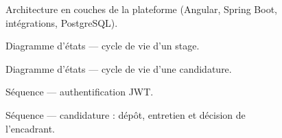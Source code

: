 

\begin{figure}[H]
\centering
{}
\caption{Architecture en couches de la plateforme (Angular, Spring Boot, intégrations, PostgreSQL).}
\label{fig:architecture}
\end{figure}

\begin{figure}[H]
\centering
{}
\caption{Diagramme d'états — cycle de vie d'un stage.}
\label{fig:etat-stage}
\end{figure}

\begin{figure}[H]
\centering
{}
\caption{Diagramme d'états — cycle de vie d'une candidature.}
\label{fig:etat-candidature}
\end{figure}


\begin{figure}[H]
\centering
{}
\caption{Séquence — authentification JWT.}
\label{fig:seq-login}
\end{figure}

\begin{figure}[H]
\centering
{}
\caption{Séquence — candidature : dépôt, entretien et décision de l'encadrant.}
\label{fig:seq-candidature}
\end{figure}

